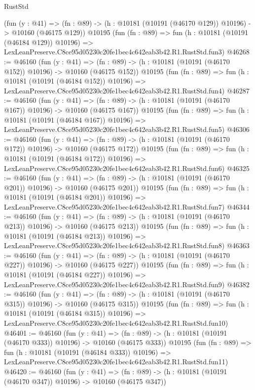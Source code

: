 \begin{lexlean}{RustStd}
\begin{coremodule}
    (fun (y : @41) =>
    (fn : @89) -> (h : @10181 (@10191 (@46170 @129)) @10196) -> @10160 (@46175 @129))
    @10195
    (fun (fn : @89) =>
    fun (h : @10181 (@10191 (@46184 @129)) @10196) =>
    LexLeanPreserve.C8ce95d05230c20fe1bec4c642eab3b42.R1.RustStd.fun3)
@46268 := @46160
    (fun (y : @41) =>
    (fn : @89) -> (h : @10181 (@10191 (@46170 @152)) @10196) -> @10160 (@46175 @152))
    @10195
    (fun (fn : @89) =>
    fun (h : @10181 (@10191 (@46184 @152)) @10196) =>
    LexLeanPreserve.C8ce95d05230c20fe1bec4c642eab3b42.R1.RustStd.fun4)
@46287 := @46160
    (fun (y : @41) =>
    (fn : @89) -> (h : @10181 (@10191 (@46170 @167)) @10196) -> @10160 (@46175 @167))
    @10195
    (fun (fn : @89) =>
    fun (h : @10181 (@10191 (@46184 @167)) @10196) =>
    LexLeanPreserve.C8ce95d05230c20fe1bec4c642eab3b42.R1.RustStd.fun5)
@46306 := @46160
    (fun (y : @41) =>
    (fn : @89) -> (h : @10181 (@10191 (@46170 @172)) @10196) -> @10160 (@46175 @172))
    @10195
    (fun (fn : @89) =>
    fun (h : @10181 (@10191 (@46184 @172)) @10196) =>
    LexLeanPreserve.C8ce95d05230c20fe1bec4c642eab3b42.R1.RustStd.fun6)
@46325 := @46160
    (fun (y : @41) =>
    (fn : @89) -> (h : @10181 (@10191 (@46170 @201)) @10196) -> @10160 (@46175 @201))
    @10195
    (fun (fn : @89) =>
    fun (h : @10181 (@10191 (@46184 @201)) @10196) =>
    LexLeanPreserve.C8ce95d05230c20fe1bec4c642eab3b42.R1.RustStd.fun7)
@46344 := @46160
    (fun (y : @41) =>
    (fn : @89) -> (h : @10181 (@10191 (@46170 @213)) @10196) -> @10160 (@46175 @213))
    @10195
    (fun (fn : @89) =>
    fun (h : @10181 (@10191 (@46184 @213)) @10196) =>
    LexLeanPreserve.C8ce95d05230c20fe1bec4c642eab3b42.R1.RustStd.fun8)
@46363 := @46160
    (fun (y : @41) =>
    (fn : @89) -> (h : @10181 (@10191 (@46170 @227)) @10196) -> @10160 (@46175 @227))
    @10195
    (fun (fn : @89) =>
    fun (h : @10181 (@10191 (@46184 @227)) @10196) =>
    LexLeanPreserve.C8ce95d05230c20fe1bec4c642eab3b42.R1.RustStd.fun9)
@46382 := @46160
    (fun (y : @41) =>
    (fn : @89) -> (h : @10181 (@10191 (@46170 @315)) @10196) -> @10160 (@46175 @315))
    @10195
    (fun (fn : @89) =>
    fun (h : @10181 (@10191 (@46184 @315)) @10196) =>
    LexLeanPreserve.C8ce95d05230c20fe1bec4c642eab3b42.R1.RustStd.fun10)
@46401 := @46160
    (fun (y : @41) =>
    (fn : @89) -> (h : @10181 (@10191 (@46170 @333)) @10196) -> @10160 (@46175 @333))
    @10195
    (fun (fn : @89) =>
    fun (h : @10181 (@10191 (@46184 @333)) @10196) =>
    LexLeanPreserve.C8ce95d05230c20fe1bec4c642eab3b42.R1.RustStd.fun11)
@46420 := @46160
    (fun (y : @41) =>
    (fn : @89) -> (h : @10181 (@10191 (@46170 @347)) @10196) -> @10160 (@46175 @347))

\end{coremodule}
\end{lexlean}
